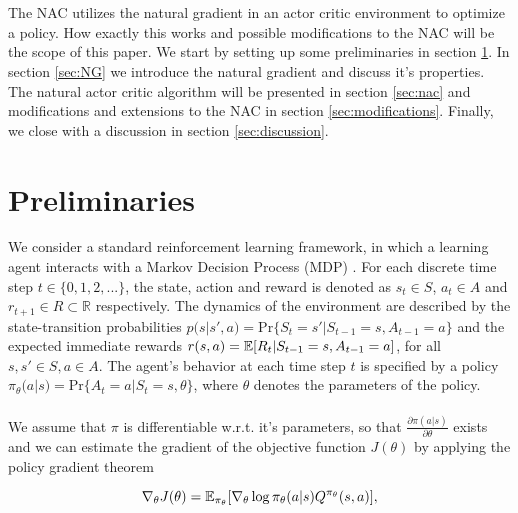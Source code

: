 \\\\
The NAC utilizes the natural gradient in an actor critic environment to optimize a policy. How exactly this works and possible modifications to the NAC will be the scope of this paper. We start by setting up some preliminaries in section \ref{sec:preliminaries}. In section \ref{sec:NG} we introduce the natural gradient and discuss it's properties. The natural actor critic algorithm will be presented in section \ref{sec:nac} and modifications and extensions to the NAC in section \ref{sec:modifications}. Finally, we close with a discussion in section \ref{sec:discussion}.


\section{Preliminaries}
\label{sec:preliminaries}

We consider a standard reinforcement learning framework, in which a learning agent interacts with a Markov Decision Process (MDP) \citep{howard1960dynamic, sutton2018reinforcement}. For each discrete time step $t \in \{0,1,2,...\}$, the state, action and reward is denoted as $s_t \in \mathit{S}$, $a_t \in A$ and $r_{t+1} \in \mathit{R} \subset \mathbb{R}$ respectively. The dynamics of the environment are described by the state-transition probabilities $p(s|s', a) = \text{Pr}\{S_t = s' | S_{t-1} = s, A_{t-1} = a\}$ and the expected immediate rewards $r(s, a) = \operatorname{\mathbb{E}}[R_t | S_{t-1} = s, A_{t-1} = a]$, for all $s, s' \in S, a \in A$. The agent's behavior at each time step $t$ is specified by a policy $\pi_{\theta}(a|s) = \text{Pr}\{A_t = a | S_{t} = s, \theta\}$, where $\theta$ denotes the parameters of the policy. 
\\\\
We assume that $\pi$ is differentiable w.r.t. it's parameters, so that $\tfrac{\partial\pi(a|s)}{\partial \theta}$ exists and we can estimate the gradient of the objective function $J(\theta)$ by applying the policy gradient theorem \citep{sutton2000policy}

\begin{equation}
\label{equ:policygradienttheorem}
\nabla_{\theta}J(\theta)=\operatorname{\mathbb{E}}_{\pi_{\theta}}[\nabla_{\theta}\log\pi_{\theta}(a|s) Q^{\pi_{\theta}}(s, a)],
\end{equation}


